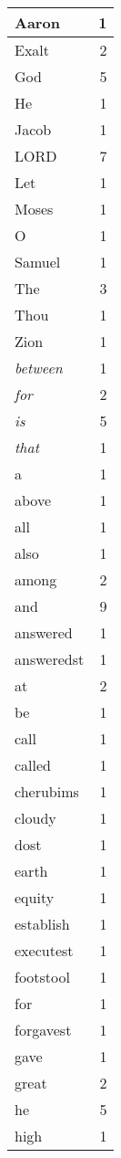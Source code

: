 \begin{center}
\begin{longtable}{l|r}
\hline \hline
\endlastfoot
Aaron & 1 \\ \hline
Exalt & 2 \\ \hline
God & 5 \\ \hline
He & 1 \\ \hline
Jacob & 1 \\ \hline
LORD & 7 \\ \hline
Let & 1 \\ \hline
Moses & 1 \\ \hline
O & 1 \\ \hline
Samuel & 1 \\ \hline
The & 3 \\ \hline
Thou & 1 \\ \hline
Zion & 1 \\ \hline
\emph{between} & 1 \\ \hline
\emph{for} & 2 \\ \hline
\emph{is} & 5 \\ \hline
\emph{that} & 1 \\ \hline
a & 1 \\ \hline
above & 1 \\ \hline
all & 1 \\ \hline
also & 1 \\ \hline
among & 2 \\ \hline
and & 9 \\ \hline
answered & 1 \\ \hline
answeredst & 1 \\ \hline
at & 2 \\ \hline
be & 1 \\ \hline
call & 1 \\ \hline
called & 1 \\ \hline
cherubims & 1 \\ \hline
cloudy & 1 \\ \hline
dost & 1 \\ \hline
earth & 1 \\ \hline
equity & 1 \\ \hline
establish & 1 \\ \hline
executest & 1 \\ \hline
footstool & 1 \\ \hline
for & 1 \\ \hline
forgavest & 1 \\ \hline
gave & 1 \\ \hline
great & 2 \\ \hline
he & 5 \\ \hline
high & 1 \\ \hline

\end{longtable}
\end{center}
